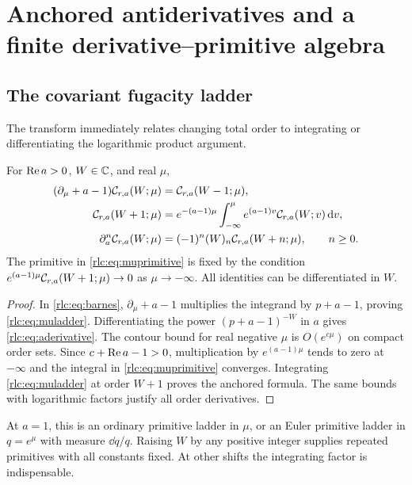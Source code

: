 \section{Anchored antiderivatives and a finite derivative--primitive algebra}
\label{rlc:sec:primitives}

\subsection{The covariant fugacity ladder}
The transform immediately relates changing total order to integrating
or differentiating the logarithmic product argument.

\begin{theorem}
\label{rlc:thm:ladder}
For $\operatorname{Re} a>0$, $W\in\mathbb C$, and real $\mu$,
\begin{align}
 (\partial_\mu+a-1)\mathcal C_{r,a}(W;\mu)
      &=\mathcal C_{r,a}(W-1;\mu),\label{rlc:eq:muladder}\\
 \mathcal C_{r,a}(W+1;\mu)
      &=e^{-(a-1)\mu}\int_{-\infty}^{\mu}
              e^{(a-1)v}\mathcal C_{r,a}(W;v)\,\mathrm d v,
        \label{rlc:eq:muprimitive}\\
 \partial_a^n\mathcal C_{r,a}(W;\mu)
      &=(-1)^n(W)_n\mathcal C_{r,a}(W+n;\mu),\qquad n\ge0.
       \label{rlc:eq:aderivative}
\end{align}
The primitive in \eqref{rlc:eq:muprimitive} is fixed by the condition
$e^{(a-1)\mu}\mathcal C_{r,a}(W+1;\mu)\to0$ as $\mu\to-\infty$.
All identities can be differentiated in $W$.
\end{theorem}
\begin{proof}
In \eqref{rlc:eq:barnes}, $\partial_\mu+a-1$ multiplies the integrand
by $p+a-1$, proving \eqref{rlc:eq:muladder}. Differentiating the power
$(p+a-1)^{-W}$ in $a$ gives \eqref{rlc:eq:aderivative}.
The contour bound for real negative $\mu$ is $O(e^{c\mu})$ on compact
order sets. Since $c+\operatorname{Re} a-1>0$, multiplication by
$e^{(a-1)\mu}$ tends to zero at $-\infty$ and the integral in
\eqref{rlc:eq:muprimitive} converges. Integrating
\eqref{rlc:eq:muladder} at order $W+1$ proves the anchored formula.
The same bounds with logarithmic factors justify all order derivatives.
\end{proof}

At $a=1$, this is an ordinary primitive ladder in $\mu$, or an Euler
primitive ladder in $q=e^\mu$ with measure $\dd q/q$. Raising $W$ by
any positive integer supplies repeated primitives with all constants
fixed. At other shifts the integrating factor is indispensable.

